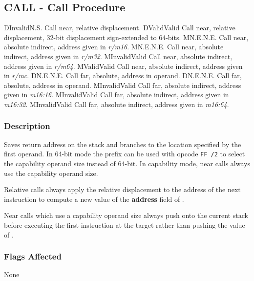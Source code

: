 \clearpage
{}
{}
\subsection*{CALL - Call Procedure}

\begin{x86opcodetable}
  {D}{Invalid}{N.S.}
  {Call near, relative displacement.}
  {D}{Valid}{Valid}
  {Call near, relative displacement, 32-bit displacement sign-extended
    to 64-bits.}
  {M}{N.E.}{N.E.}
  {Call near, absolute indirect, address given in \emph{r/m16}.}
  {M}{N.E.}{N.E.}
  {Call near, absolute indirect, address given in \emph{r/m32}.}
  {M}{Invalid}{Valid}
  {Call near, absolute indirect, address given in \emph{r/m64}.}
  {M}{Valid}{Valid}
  {Call near, absolute indirect, address given in \emph{r/mc}.}
  {D}{N.E.}{N.E.}
  {Call far, absolute, address in operand.}
  {D}{N.E.}{N.E.}
  {Call far, absolute, address in operand.}
  {M}{Invalid}{Valid}
  {Call far, absolute indirect, address given in \emph{m16:16}.}
  {M}{Invalid}{Valid}
  {Call far, absolute indirect, address given in \emph{m16:32}.}
  {M}{Invalid}{Valid}
  {Call far, absolute indirect, address given in \emph{m16:64}.}
\end{x86opcodetable}

\begin{x86opentable}
\end{x86opentable}

\subsubsection*{Description}

Saves return address on the stack and branches to the location
specified by the first operand.  In 64-bit mode the 
prefix can be used with opcode \texttt{FF /2} to select the capability
operand size instead of 64-bit.  In capability mode, near calls always
use the capability operand size.

Relative calls always apply the relative displacement to the address
of the next instruction to compute a new value of the \textbf{address}
field of \CIP{}.

Near calls which use a capability operand size always push \CIP{} onto
the current stack before executing the first instruction at the target
rather than pushing the value of \RIP{}.

\subsubsection*{Flags Affected}

None
